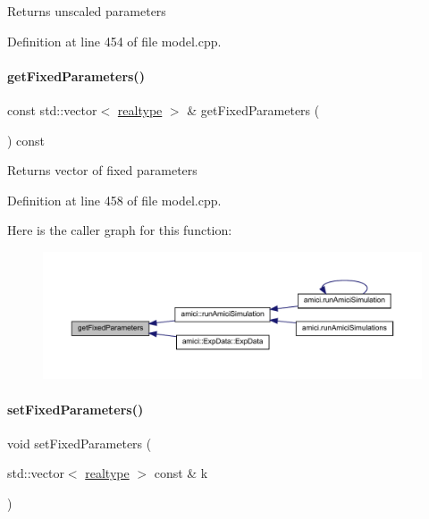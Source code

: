 \begin{DoxyReturn}{Returns}
unscaled parameters 
\end{DoxyReturn}


Definition at line 454 of file model.\+cpp.

\mbox{\label{classamici_1_1_model_a76b24282a74eaca67d656149310dc07c}} 
\paragraph{\texorpdfstring{get\+Fixed\+Parameters()}{getFixedParameters()}}
{\footnotesize\ttfamily const std\+::vector$<$ \mbox{\hyperlink{namespaceamici_a1bdce28051d6a53868f7ccbf5f2c14a3}{realtype}} $>$ \& get\+Fixed\+Parameters (\begin{DoxyParamCaption}{ }\end{DoxyParamCaption}) const}

\begin{DoxyReturn}{Returns}
vector of fixed parameters 
\end{DoxyReturn}


Definition at line 458 of file model.\+cpp.

Here is the caller graph for this function\+:
\nopagebreak
\begin{figure}[H]
\begin{center}
\leavevmode
\includegraphics[width=350pt]{classamici_1_1_model_a76b24282a74eaca67d656149310dc07c_icgraph}
\end{center}
\end{figure}
\mbox{\label{classamici_1_1_model_a14ba63ae81b4e8fa1f46884b703e2c30}} 
\paragraph{\texorpdfstring{set\+Fixed\+Parameters()}{setFixedParameters()}}
{\footnotesize\ttfamily void set\+Fixed\+Parameters (\begin{DoxyParamCaption}\item[{std\+::vector$<$ \mbox{\hyperlink{namespaceamici_a1bdce28051d6a53868f7ccbf5f2c14a3}{realtype}} $>$ const \&}]{k }\end{DoxyParamCaption})}



